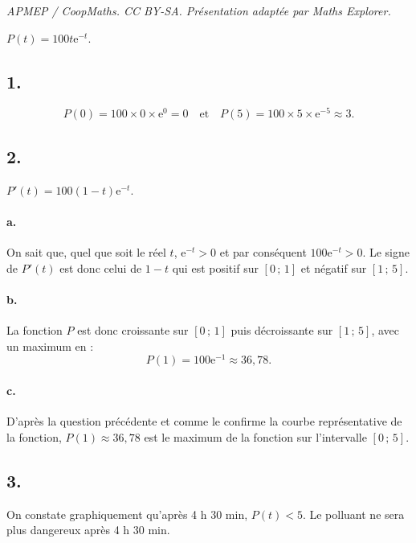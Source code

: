 \documentclass[10pt]{article}
\providecommand{\e}{{\mathrm{e}}}
\begin{document}
\noindent\textit{APMEP / CoopMaths. CC BY-SA. Présentation adaptée par Maths Explorer.}\par\medskip
\(P(t) = 100t\e^{-t}\).

\subsection*{1.}

\[
P(0) = 100 \times 0 \times \e^0 = 0 \quad \text{et} \quad P(5) = 100 \times 5 \times \e^{-5} \approx 3.
\]

\subsection*{2.}

\(P'(t) = 100(1 - t)\e^{-t}\).

\paragraph{a.} On sait que, quel que soit le réel \(t\), \(\e^{-t} > 0\) et par conséquent \(100\e^{-t} > 0\). Le signe de \(P'(t)\) est donc celui de \(1 - t\) qui est positif sur \([0 \,;\, 1]\) et négatif sur \([1 \,;\, 5]\).

\paragraph{b.} La fonction \(P\) est donc croissante sur \([0 \,;\, 1]\) puis décroissante sur \([1 \,;\, 5]\), avec un maximum en :
\[
P(1) = 100\e^{-1} \approx 36{,}78.
\]

\begin{center}
\end{center}

\paragraph{c.} D'après la question précédente et comme le confirme la courbe représentative de la fonction, \(P(1) \approx 36{,}78\) est le maximum de la fonction sur l'intervalle \([0 \,;\, 5]\).

\subsection*{3.}

On constate graphiquement qu'après 4 h 30 min, \(P(t) < 5\). Le polluant ne sera plus dangereux après 4 h 30 min.
\end{document}
